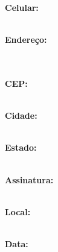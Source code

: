 \documentclass[12pt,a4paper]{article}
\newcommand{\formfield}[2][1]{%
	\textcolor{labelcolor}{\textbf{#2}} \\[0.3cm]
	\textcolor{linecolor}{\makebox[\linewidth]{\hrulefill}} \\[#1cm]
}
\begin{document}
\noindent
\begin{minipage}{\textwidth}
	\formfield[1.2]{Celular:}
\end{minipage}

\noindent
\begin{minipage}{\textwidth}
	\textcolor{labelcolor}{\textbf{Endereço:}} \\[0.3cm]
	\textcolor{linecolor}{\makebox[\textwidth]{\hrulefill}} \\[0.3cm]
	\textcolor{linecolor}{\makebox[\textwidth]{\hrulefill}} \\[1.2cm]
\end{minipage}

\noindent
\begin{minipage}[t]{0.25\textwidth}
	\formfield[0.8]{CEP:}
\end{minipage}%
\hfill
\begin{minipage}[t]{0.45\textwidth}
	\formfield[0.8]{Cidade:}
\end{minipage}%
\hfill
\begin{minipage}[t]{0.25\textwidth}
	\formfield[0.8]{Estado:}
\end{minipage}

\vspace{1cm}

\noindent
\begin{minipage}{\textwidth}
	\formfield[0.5]{Assinatura:}
\end{minipage}

\vspace{0.5cm}

\noindent
\begin{minipage}[t]{0.6\textwidth}
	\formfield[0.5]{Local:}
\end{minipage}%
\hfill
\begin{minipage}[t]{0.35\textwidth}
	\formfield[0.5]{Data:}
\end{minipage}
\end{document}
